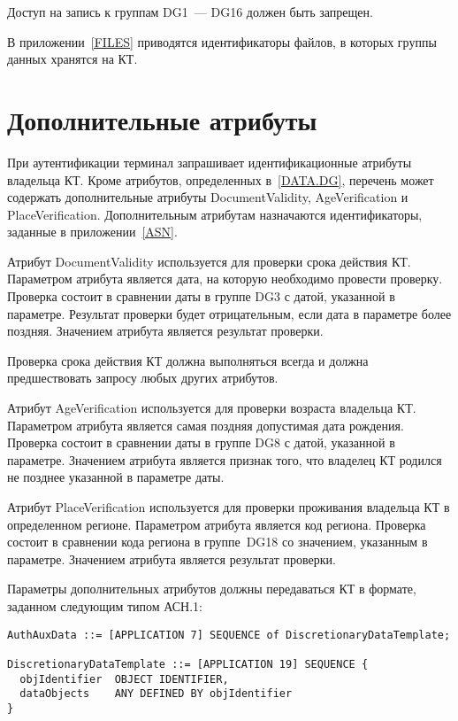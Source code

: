 Доступ на запись к группам DG1~--- DG16 должен быть запрещен.
 
В приложении~\ref{FILES} приводятся идентификаторы файлов, 
в которых группы данных хранятся на КТ.

\section{Дополнительные атрибуты}\label{DATA.Optional}

При аутентификации терминал запрашивает идентификационные атрибуты
владельца КТ. Кроме атрибутов, определенных в~\ref{DATA.DG}, 
перечень может содержать дополнительные атрибуты DocumentValidity, 
AgeVerification и PlaceVerification. Дополнительным атрибутам назначаются 
идентификаторы, заданные в приложении~\ref{ASN}. 

Атрибут DocumentValidity используется для проверки срока действия КТ. 
Параметром атрибута является дата, на которую необходимо провести 
проверку. Проверка состоит в сравнении даты в группе DG3 
с датой, указанной в параметре. Результат проверки будет 
отрицательным, если дата в параметре более поздняя. Значением атрибута 
является результат проверки. 

Проверка срока действия КТ должна выполняться всегда и должна предшествовать 
запросу любых других атрибутов. 

Атрибут AgeVerification используется для проверки возраста владельца КТ. 
Параметром атрибута является самая поздняя допустимая дата рождения. 
Проверка состоит в сравнении даты в группе DG8 с датой, указанной в параметре. 
Значением атрибута является признак того, что владелец КТ 
родился не позднее указанной в параметре даты. 

Атрибут PlaceVerification используется для проверки проживания владельца 
КТ в определенном регионе. Параметром атрибута является код региона. 
Проверка состоит в сравнении кода региона в группе~DG18 со значением, указанным 
в параметре. Значением атрибута является результат проверки. 

Параметры дополнительных атрибутов должны передаваться КТ в формате, 
заданном следующим типом АСН.1: 
%
\begin{verbatim}
AuthAuxData ::= [APPLICATION 7] SEQUENCE of DiscretionaryDataTemplate;

DiscretionaryDataTemplate ::= [APPLICATION 19] SEQUENCE {
  objIdentifier  OBJECT IDENTIFIER,
  dataObjects    ANY DEFINED BY objIdentifier
}
\end{verbatim}

